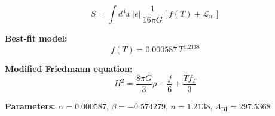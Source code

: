 
\begin{equation}
  S = \int d^4x \, |e| \, \frac{1}{16\pi G} \left[ f(T) + \mathcal{L}_m \right]
\end{equation}

\textbf{Best-fit model:}
\begin{equation}
  f(T) = 0.000587 \, T^{1.2138}
\end{equation}

\textbf{Modified Friedmann equation:}
\begin{equation}
  H^2 = \frac{8\pi G}{3} \rho - \frac{f}{6} + \frac{T f_T}{3}
\end{equation}

\textbf{Parameters:}
$\alpha = 0.000587$, \quad
$\beta = -0.574279$, \quad
$n = 1.2138$, \quad
$\Lambda_{\text{BI}} = 297.5368$